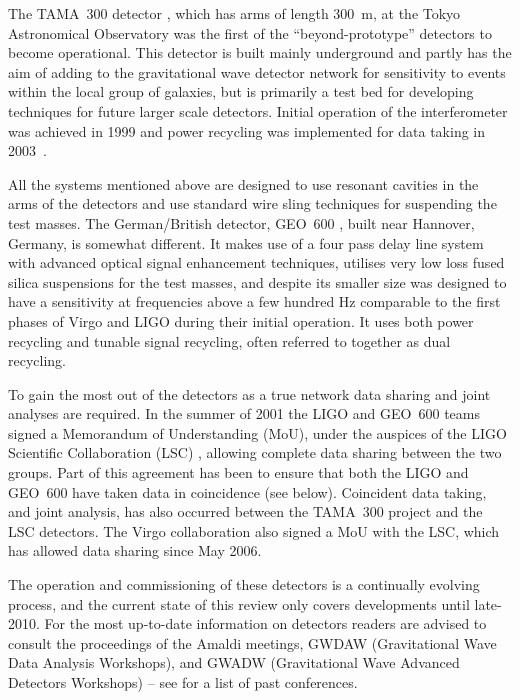\documentclass{article}
\begin{document}
The TAMA~300 detector \cite{TAMAweb}, which has arms of length 300~m, at the
Tokyo Astronomical Observatory was the first of the ``beyond-prototype'' detectors
to become operational. This detector is built mainly underground and partly has
the aim of adding to the gravitational wave detector network for sensitivity to
events within the local group of galaxies, but is primarily a test bed for 
developing techniques for future larger scale detectors. Initial operation of
the interferometer was achieved in 1999 and power recycling was implemented for
data taking in 2003~\cite{Arai:2003}.

All the systems mentioned above are designed to use resonant cavities in the
arms of the detectors and use standard wire sling techniques for suspending the
test masses. The German/British detector, GEO~600 \cite{GEOweb}, built near
Hannover, Germany, is somewhat different. It makes use of a four pass delay line
system with advanced optical signal enhancement techniques, utilises very low
loss fused silica suspensions for the test masses, and despite its smaller size 
was designed to have a
sensitivity at frequencies above a few hundred Hz comparable to the first phases
of Virgo and LIGO during their initial operation. It uses both power
recycling and tunable signal recycling, often referred to together as dual
recycling.

To gain the most out of the detectors as a true network data sharing and joint
analyses are required. In the summer of 2001 the LIGO and GEO~600 teams signed a
Memorandum of Understanding (MoU), under the auspices of the LIGO Scientific
Collaboration (LSC) \cite{LSCweb}, allowing complete data sharing between the
two groups. Part of this agreement has been to ensure that both the LIGO and
GEO~600 have taken data in coincidence (see below). Coincident data taking,
and joint analysis, has also occurred between the TAMA~300 project and the LSC
detectors. The Virgo collaboration also signed a MoU with the LSC, which 
has allowed data sharing since May 2006.

The operation and commissioning of these detectors is a continually evolving 
process, and the current state of this review only covers developments until late-2010.
For the most up-to-date information on detectors readers are advised to consult
the proceedings of the Amaldi meetings, GWDAW (Gravitational Wave Data Analysis
Workshops), and GWADW (Gravitational Wave Advanced Detectors Workshops) -- see 
\cite{confs} for a list of past conferences.
\end{document}
